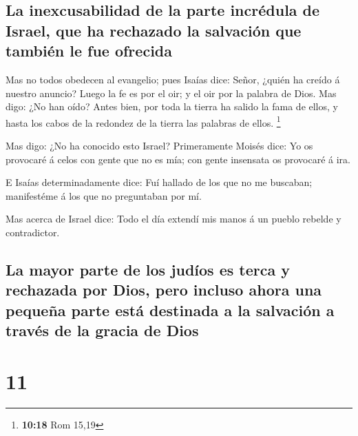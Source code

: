 \hypertarget{la-inexcusabilidad-de-la-parte-incruxe9dula-de-israel-que-ha-rechazado-la-salvaciuxf3n-que-tambiuxe9n-le-fue-ofrecida}{%
\subsection{La inexcusabilidad de la parte incrédula de Israel, que ha
rechazado la salvación que también le fue
ofrecida}\label{la-inexcusabilidad-de-la-parte-incruxe9dula-de-israel-que-ha-rechazado-la-salvaciuxf3n-que-tambiuxe9n-le-fue-ofrecida}}

 Mas no todos obedecen al evangelio; pues Isaías dice:
Señor, ¿quién ha creído á nuestro anuncio?  Luego la fe es
por el oir; y el oir por la palabra de Dios.  Mas digo: ¿No
han oído? Antes bien, por toda la tierra ha salido la fama de ellos, y
hasta los cabos de la redondez de la tierra las palabras de ellos.
\footnote{\textbf{10:18} Rom 15,19}

 Mas digo: ¿No ha conocido esto Israel? Primeramente Moisés
dice: Yo os provocaré á celos con gente que no es mía; con gente
insensata os provocaré á ira.

 E Isaías determinadamente dice: Fuí hallado de los que no
me buscaban; manifestéme á los que no preguntaban por mí.

 Mas acerca de Israel dice: Todo el día extendí mis manos á
un pueblo rebelde y contradictor.

\hypertarget{la-mayor-parte-de-los-juduxedos-es-terca-y-rechazada-por-dios-pero-incluso-ahora-una-pequeuxf1a-parte-estuxe1-destinada-a-la-salvaciuxf3n-a-travuxe9s-de-la-gracia-de-dios}{%
\subsection{La mayor parte de los judíos es terca y rechazada por Dios,
pero incluso ahora una pequeña parte está destinada a la salvación a
través de la gracia de
Dios}\label{la-mayor-parte-de-los-juduxedos-es-terca-y-rechazada-por-dios-pero-incluso-ahora-una-pequeuxf1a-parte-estuxe1-destinada-a-la-salvaciuxf3n-a-travuxe9s-de-la-gracia-de-dios}}

\hypertarget{section-10}{%
\section{11}\label{section-10}}

